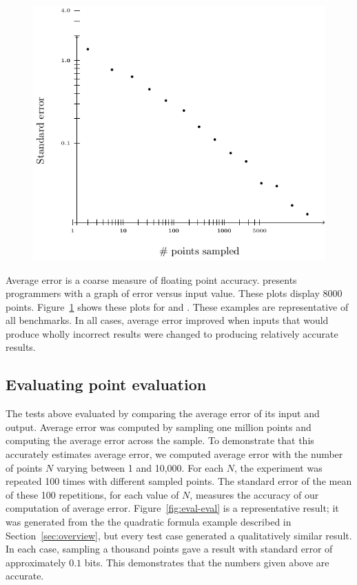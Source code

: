 \documentclass[paper.tex]{subfiles}
\begin{document}
\begin{figure}
\label{fig:eval-err}
\includegraphics[width=0.9\columnwidth]{fig/eval-err.pdf}
\caption{}
\end{figure}

Average error is a coarse measure of floating point accuracy.  \casio
presents programmers with a graph of error versus input value.  These
plots display 8000 points.  Figure~\ref{fig:eval-err} shows these
plots for  and .  These examples are
representative of all benchmarks.  In all cases, average error
improved when inputs that would produce wholly incorrect results were
changed to producing relatively accurate results.

\subsection{Evaluating point evaluation}\label{sec:eval-eval}

The tests above evaluated \casio by comparing the average error of its
input and output.  Average error was computed by sampling one million
points and computing the average error across the sample.  To
demonstrate that this accurately estimates average error, we computed
average error with the number of points $N$ varying between 1 and
10,000.  For each $N$, the experiment was repeated 100 times with
different sampled points.  The standard error of the mean of these 100
repetitions, for each value of $N$, measures the accuracy of our
computation of average error.  Figure~\ref{fig:eval-eval} is a
representative result; it was generated from the the quadratic formula
example described in Section~\ref{sec:overview}, but every test case
generated a qualitatively similar result.  In each case, sampling a
thousand points gave a result with standard error of approximately
$0.1$ bits.  This demonstrates that the numbers given above are
accurate.
\end{document}
